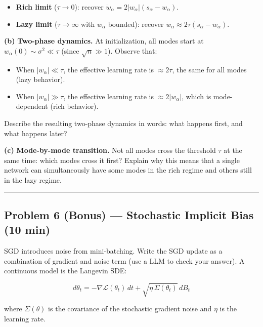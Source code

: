 \documentclass[
]{article}
\providecommand{\tightlist}{%
  \setlength{\itemsep}{0pt}\setlength{\parskip}{0pt}}
\begin{document}
\begin{itemize}
\tightlist
\item
  \textbf{Rich limit} (\(\tau \to 0\)): recover
  \(\dot{w}_\alpha = 2|w_\alpha|(s_\alpha - w_\alpha)\).
\item
  \textbf{Lazy limit} (\(\tau \to \infty\) with \(w_\alpha\) bounded):
  recover \(\dot{w}_\alpha \approx 2\tau(s_\alpha - w_\alpha)\).
\end{itemize}

\textbf{(b)} \textbf{Two-phase dynamics.} At initialization, all modes
start at \(w_\alpha(0) \sim \sigma^2 \ll \tau\) (since
\(\sqrt{n} \gg 1\)). Observe that:

\begin{itemize}
\tightlist
\item
  When \(|w_\alpha| \ll \tau\), the effective learning rate is
  \(\approx 2\tau\), the same for all modes (lazy behavior).
\item
  When \(|w_\alpha| \gg \tau\), the effective learning rate is
  \(\approx 2|w_\alpha|\), which is mode-dependent (rich behavior).
\end{itemize}

Describe the resulting two-phase dynamics in words: what happens first,
and what happens later?

\textbf{(c)} \textbf{Mode-by-mode transition.} Not all modes cross the
threshold \(\tau\) at the same time: which modes cross it first? Explain
why this means that a single network can simultaneously have some modes
in the rich regime and others still in the lazy regime.

\begin{center}\rule{0.5\linewidth}{0.5pt}\end{center}

\subsection{Problem 6 (Bonus) --- Stochastic Implicit Bias (10
min)}\label{problem-6-bonus-stochastic-implicit-bias-10-min}

SGD introduces noise from mini-batching. Write the SGD update as a combination of gradient and noise term (use a LLM to check your answer). A continuous model is the
Langevin SDE:

\[d\theta_t = -\nabla \mathcal{L}(\theta_t)\,dt + \sqrt{\eta\,\Sigma(\theta_t)}\,dB_t\]

where \(\Sigma(\theta)\) is the covariance of the stochastic gradient
noise and \(\eta\) is the learning rate.
\end{document}
